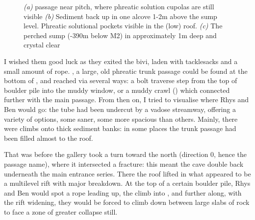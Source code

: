 \begin{figure*}[t!]
\checkoddpage \ifoddpage \forcerectofloat \else \forceversofloat \fi
\centering
\begin{subfigure}[t]{0.328\textwidth}
\centering
{}
 \caption{}\label{smer 0 dave}
\end{subfigure}
    \hfill
    \begin{subfigure}[t]{0.662\textwidth}
        \centering
        \caption{} \label{sump sediment}
    \end{subfigure}
    
    \vspace{0.3cm}
    \begin{subfigure}[t]{\textwidth}
    \centering
        \caption{} \label{sump of hearts}
    \end{subfigure}
    \caption{
    \emph{(a)} \protect{} passage near \protect{} pitch, where phreatic solution cupolas are still visible 
    \emph{(b)} Sediment back up in one alcove 1-2m above the sump level. Phreatic solutional pockets visible in the (low) roof.
    \emph{(c)} The perched sump (-390m below M2) in \protect{} approximately 1m deep and crystal clear }
\end{figure*}


I wished them good luck as they exited the bivi, laden with tacklesacks and a small amount of rope. , a large, old phreatic trunk passage could be found at the bottom of , and reached via several ways: a bolt traverse step from the top of boulder pile into the muddy window, or a muddy crawl () which connected further with the main passage. From then on, I tried to visualise where Rhys and Ben would go: the tube had been undercut by a vadose streamway, offering a variety of options, some saner, some more spacious than others. Mainly, there were climbs onto thick sediment banks: in some places the trunk passage had been filled almost to the roof. 

That was before the gallery took a turn toward the north (direction 0, hence the passage name), where it intersected a fracture: this meant the cave double back underneath the main  entrance series. There the roof lifted in what appeared to be a multilevel rift with major breakdown. At the top of a certain boulder pile, Rhys and Ben would spot a rope leading up, the climb into , and further along, with the rift widening, they would be forced to climb down between large slabs of rock to face a zone of greater collapse still. 

